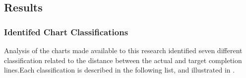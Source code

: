 \subsection{Results} %
\label{sec:progress_results}

\subsubsection{Identifed Chart Classifications} %
\label{sub:identified_chart_classifications}

Analysis of the charts made available to this research identified seven different classification related to the distance between the actual and target completion lines.Each classification is described in the following list, and illustrated in .


